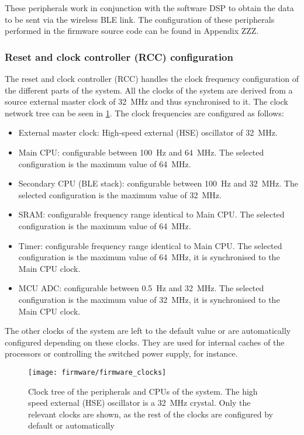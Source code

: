 These peripherals work in conjunction with the software DSP to obtain the data to be sent via the wireless BLE link. The configuration of these peripherals performed in the firmware source code can be found in Appendix ZZZ.

\subsubsection{Reset and clock controller (RCC) configuration} \label{sec:rcc}

The reset and clock controller (RCC) handles the clock frequency configuration of the different parts of the system. All the clocks of the system are derived from a source external master clock of \SI{32}{\mega\hertz} and thus synchronised to it. The clock network tree can be seen in \cref{fig:firmware_clock_tree}. The clock frequencies are configured as follows:
\begin{itemize}
	\item External master clock: High-speed external (HSE) oscillator of \SI{32}{\mega\hertz}.
	\item Main CPU: configurable between \SI{100}{\hertz} and \SI{64}{\mega\hertz}. The selected configuration is the maximum value of \SI{64}{\mega\hertz}.
	\item Secondary CPU (BLE stack): configurable between \SI{100}{\hertz} and \SI{32}{\mega\hertz}. The selected configuration is the maximum value of \SI{32}{\mega\hertz}.
	\item SRAM: configurable frequency range identical to Main CPU. The selected configuration is the maximum value of \SI{64}{\mega\hertz}.
	\item Timer: configurable frequency range identical to Main CPU. The selected configuration is the maximum value of \SI{64}{\mega\hertz}, it is synchronised to the Main CPU clock.
	\item MCU ADC: configurable between \SI{0.5}{\hertz} and \SI{32}{\mega\hertz}. The selected configuration is the maximum value of \SI{32}{\mega\hertz}, it is synchronised to the Main CPU clock.
\end{itemize}

The other clocks of the system are left to the default value or are automatically configured depending on these clocks. They are used for internal caches of the processors or controlling the switched power supply, for instance.

\begin{figure}[ht]
	\centering
	\texttt{[image: firmware/firmware\_clocks]}
	\caption{Clock tree of the peripherals and CPUs of the system. The high speed external (HSE) oscillator is a \SI{32}{\mega\hertz} crystal. Only the relevant clocks are shown, as the rest of the clocks are configured by default or automatically}
	\label{fig:firmware_clock_tree}
\end{figure}


